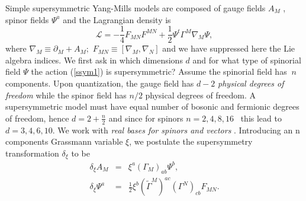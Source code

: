 \documentclass[a4paper,12pt]{book}
\begin{document}
Simple supersymmetric Yang-Mills models are composed of gauge fields $A_{M}$%
, spinor fields $\Psi ^{a}$ and the Lagrangian density is 
\begin{equation}
\mathcal{L}=-\frac{1}{4}F_{MN}F^{MN}+\frac{1}{2}\Psi ^{t}\Gamma ^{M}\nabla
_{M}\Psi ,  \label{ssym1}
\end{equation}
where $\nabla _{M}\equiv \partial _{M}+A_{M};$ $F_{MN}\equiv \left[ \nabla
_{M},\nabla _{N}\right] $ and we have suppressed here the Lie algebra
indices. We first ask in which dimensions $d$ and for what type of spinorial
field $\Psi $ the action (\ref{ssym1}) is supersymmetric? Assume the
spinorial field has $\ n$ components. Upon quantization, the gauge field has 
$d-2$ \emph{physical degrees of freedom} while the spinor field has $n/2$
physical degrees of freedom. A supersymmetric model must have equal number
of bosonic and fermionic degrees of freedom, hence $d=2+\frac{n}{2}$ and
since for spinors $n=2,4,8,16$ \ this lead to $d=3,4,6,10.$ We work with 
\emph{real bases for spinors and vectors} \cite{r6}. Introducing an n
components Grassmann variable $\xi $, we postulate the supersymmetry
transformation $\delta _{\xi }$ to be 
\begin{eqnarray}
\delta _{\xi }A_{M} &=&\xi ^{a}\left( \Gamma _{M}\right) _{ab}\Psi ^{b}, 
\nonumber \\
\delta _{\xi }\Psi ^{a} &=&\frac{1}{2}\xi ^{b}\left( \tilde{\Gamma}%
^{M}\right) ^{ac}\left( \Gamma ^{N}\right) _{cb}F_{MN}.  \nonumber \\
&&  \label{trs}
\end{eqnarray}
\end{document}
